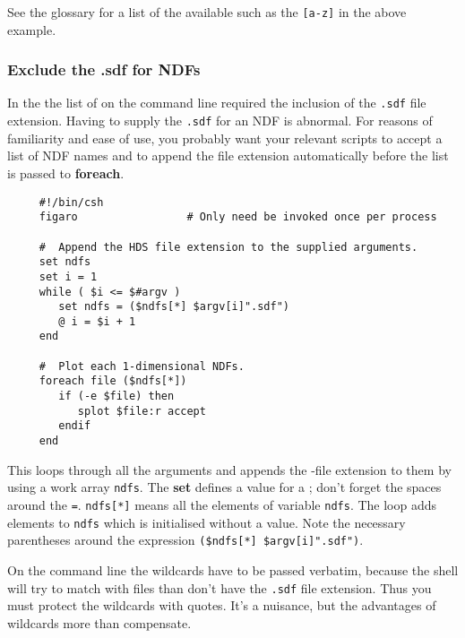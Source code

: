 See the glossary for a list of the available
 such as the {\tt [a-z]} in the
above example.

\subsubsection{Exclude the .sdf for NDFs
\label{sc4_se_wildcard_nosdf}}

In the  the list of
 on the command line required the inclusion of
the {\tt .sdf} file extension.  Having to supply the {\tt .sdf} for an
NDF is abnormal.  For reasons of familiarity and ease of use, you
probably want your relevant scripts to accept a list of NDF names and
to append the file extension automatically before the list is passed to
{\bf foreach}.  

\small
\begin{verbatim}
     #!/bin/csh
     figaro                 # Only need be invoked once per process

     #  Append the HDS file extension to the supplied arguments.
     set ndfs
     set i = 1
     while ( $i <= $#argv )
        set ndfs = ($ndfs[*] $argv[i]".sdf")
        @ i = $i + 1
     end

     #  Plot each 1-dimensional NDFs.
     foreach file ($ndfs[*])
        if (-e $file) then
           splot $file:r accept
        endif
     end
\end{verbatim}
\normalsize
This loops through all the arguments and appends the {\sf
\HDSref}-file extension to them by using a work array {\tt ndfs}.  The
{\bf set} defines a value for a ; don't forget the spaces around the {\tt =}.
{\tt ndfs[*]} means all the elements of variable {\tt ndfs}.  The loop
adds elements to {\tt ndfs} which is initialised without a value.
Note the necessary parentheses around the expression {\tt (\$ndfs[*]
\$argv[i]".sdf")}.

On the command line the wildcards have to be passed verbatim, because
the shell will try to match with files than don't have the {\tt .sdf} 
file extension.  Thus you must protect the wildcards with quotes.
It's a nuisance, but the advantages of wildcards more than compensate.

